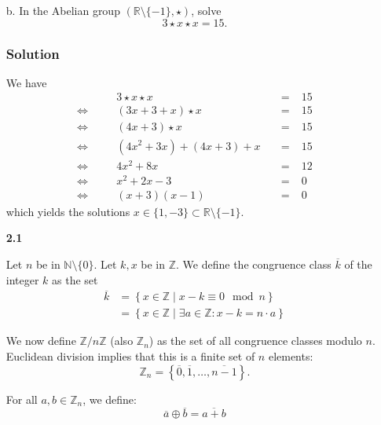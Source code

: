 \documentclass[11pt]{article}
\newcommand{\R}{\mathbb{R}}
\newcommand{\Z}{\mathbb{Z}}
\newcommand{\N}{\mathbb{N}}
\newcommand{\set}[1]{\left\{#1\right\}}                  %
\newcommand{\tuple}[1]{\left(#1\right)}                  %
\newcommand{\cls}[1]{\overline{#1}}                      %
\theoremstyle{definition}
\theoremstyle{plain}
\theoremstyle{remark}
\begin{document}
\begin{enumerate}
    \item[b.] In the Abelian group $\tuple{ \R \setminus \{-1\}, \star }$, solve
          \[
              3 \star x \star x = 15.
          \]

          \subsubsection*{Solution}

          We have
          \[
              \begin{alignedat}{3}
                            &  & 3 \star x \star x          &  & \; = \; & 15 \\
                  \iff\quad &  & (3x + 3 + x) \star x       &  & \; =\;  & 15 \\
                  \iff\quad &  & (4x + 3) \star x           &  & \; =\;  & 15 \\
                  \iff\quad &  & (4x^2 + 3x) + (4x + 3) + x &  & \; =\;  & 15 \\
                  \iff\quad &  & 4x^2 + 8x                  &  & \; =\;  & 12 \\
                  \iff\quad &  & x^2 + 2x -3                &  & \; =\;  & 0  \\
                  \iff\quad &  & (x + 3) (x - 1)            &  & \; =\;  & 0
              \end{alignedat}
          \]
          which yields the solutions $x \in \{1, -3\} \subset \R \setminus \{-1\}$.

    \item[\textbf{2.1}]

          Let $n$ be in $\N \setminus \{0\}$. Let $k, x$ be in $\Z$. We define the congruence class $\cls{k}$ of the
          integer $k$ as the set
          \[
              \begin{aligned}
                  \cls{k} & = \set{ x \in \Z \mid x - k \equiv 0 \mod n }               \\
                          & = \set{ x \in \Z \mid \exists a \in \Z: x - k = n \cdot a }
              \end{aligned}
          \]

          We now define $\Z / n\Z$ (also $\Z_n$) as the set of all congruence classes modulo $n$.
          Euclidean division implies that this is a finite set of $n$ elements:
          \[
              \Z_n = \set{ \cls{0}, \cls{1}, \ldots, \cls{n - 1} }.
          \]

          For all $a, b \in \Z_n$, we define:
          \[
              \cls{a} \oplus \cls{b} = \cls{a + b}
          \]


\end{enumerate}
\end{document}
